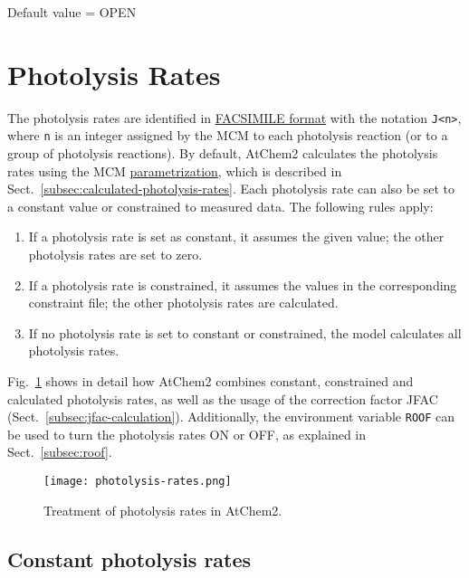 Default value = OPEN

\section{Photolysis Rates} \label{sec:photolysis-rates}

The photolysis rates are identified in
\hyperref[subsec:facsimile-format]{FACSIMILE format} with the notation
\verb|J<n>|, where \texttt{n} is an integer assigned by the MCM to
each photolysis reaction (or to a group of photolysis reactions). By
default, AtChem2 calculates the photolysis rates using the MCM
\href{http://mcm.leeds.ac.uk/MCM/parameters/photolysis_param.htt}{parametrization},
which is described in Sect.~\ref{subsec:calculated-photolysis-rates}.
Each photolysis rate can also be set to a constant value or
constrained to measured data. The following rules apply:

\begin{enumerate}
\item If a photolysis rate is set as constant, it assumes the given
  value; the other photolysis rates are set to zero.
\item If a photolysis rate is constrained, it assumes the values in
  the corresponding constraint file; the other photolysis rates are
  calculated.
\item If no photolysis rate is set to constant or constrained, the
  model calculates all photolysis rates.
\end{enumerate}

Fig.~\ref{fig:photol} shows in detail how AtChem2 combines constant,
constrained and calculated photolysis rates, as well as the usage of
the correction factor JFAC (Sect.~\ref{subsec:jfac-calculation}).
Additionally, the environment variable \texttt{ROOF} can be used to
turn the photolysis rates ON or OFF, as explained in
Sect.~\ref{subsec:roof}.

\begin{figure}[htb]
  \centering
  \texttt{[image: photolysis-rates.png]}
  \caption{Treatment of photolysis rates in AtChem2.} \label{fig:photol}
\end{figure}

\subsection{Constant photolysis rates} \label{subsec:constant-photolysis-rates}

